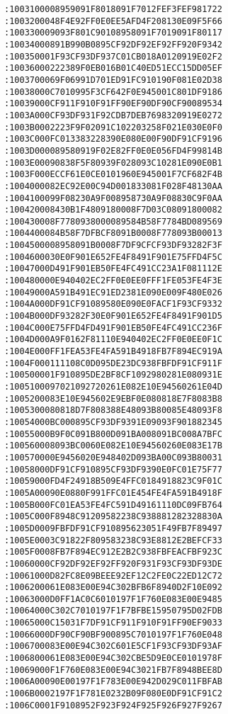 \begin{lstlisting}[language={}, basicstyle=\scriptsize, caption=Машинний код]
:1003100008959091F8018091F7012FEF3FEF981722
:1003200048F4E92FF0E0EE5AFD4F208130E09F5F66
:100330009093F801C90108958091F7019091F80117
:10034000891B990B0895CF92DF92EF92FF920F9342
:100350001F93CF93DF937C01CB018A0120919E02F2
:10036000222389F0EB016B01C40ED51ECC15DD05EF
:1003700069F06991D701ED91FC910190F081E02D38
:10038000C7010995F3CF642F0E945001C801DF9186
:10039000CF911F910F91FF90EF90DF90CF90089534
:1003A000CF93DF931F92CDB7DEB7698320919E0272
:1003B0002223F9F02091C102203258F021E030E0F0
:1003C000FC013383228390E080E00F90DF91CF9196
:1003D000089580919F02E82FF0E0E056FD4F99814B
:1003E00090838F5F80939F028093C10281E090E0B1
:1003F000ECCF61E0CE0101960E945001F7CF682F4B
:1004000082EC92E00C94D001833081F028F48130AA
:1004100099F08230A9F008958730A9F08830C9F0AA
:100420008430B1F4809180008F7D03C08091800082
:100430008F7780938000089584B58F7784BD089569
:1004400084B58F7DFBCF8091B0008F778093B00013
:1004500008958091B0008F7DF9CFCF93DF93282F3F
:1004600030E0F901E652FE4F8491F901E75FFD4F5C
:10047000D491F901EB50FE4FC491CC23A1F081112E
:100480000E940402EC2FF0E0EE0FFF1FE053FE4F3E
:10049000A591B491EC91ED2381E090E009F480E026
:1004A000DF91CF91089580E090E0FACF1F93CF9332
:1004B000DF93282F30E0F901E652FE4F8491F901D5
:1004C000E75FFD4FD491F901EB50FE4FC491CC236F
:1004D000A9F0162F81110E940402EC2FF0E0EE0F1C
:1004E000FF1FEA53FE4FA591B4918FB7F894EC919A
:1004F000111108C0D095DE23DC938FBFDF91CF911F
:100500001F910895DE2BF8CF1092980281E080931E
:1005100097021092720261E082E10E94560261E04D
:1005200083E10E945602E9EBF0E080818E7F8083B8
:1005300080818D7F808388E48093B80085E48093F8
:10054000BC000895CF93DF9391E09093F901882345
:10055000B9F0C091B800D091BA008091BC008A7BFC
:100560008093BC0060E082E10E94560260E083E17B
:100570000E9456020E948402D093BA00C093B80031
:10058000DF91CF910895CF93DF9390E0FC01E75F77
:10059000FD4F24918B509E4FFC0184918823C9F01C
:1005A00090E0880F991FFC01E454FE4FA591B4918F
:1005B000FC01EA53FE4FC591D49161110DC09FB764
:1005C000F8948C91209582238C938881282328830A
:1005D0009FBFDF91CF910895623051F49FB7F89497
:1005E0003C91822F809583238C93E8812E2BEFCF33
:1005F0008FB7F894EC912E2B2C938FBFEACFBF923C
:10060000CF92DF92EF92FF920F931F93CF93DF93DE
:10061000D82FC8E09BEEE92EF12C2FE0C22ED12C72
:1006200061E083E00E94C302BFB6F8940D2F10E092
:10063000D0FF1AC0C6010197F1F760E083E00E9485
:10064000C302C7010197F1F7BFBE15950795D02FDB
:10065000C15031F7DF91CF911F910F91FF90EF9033
:10066000DF90CF90BF900895C7010197F1F760E048
:1006700083E00E94C302C601E5CF1F93CF93DF93AF
:1006800061E083E00E94C302CBE5D9E0CE0101978F
:10069000F1F760E083E00E94C3021FB7F8948BEE8D
:1006A00090E00197F1F783E00E942D029C011FBFAB
:1006B0002197F1F781E0232B09F080E0DF91CF91C2
:1006C0001F9108952F923F924F925F926F927F9267

\end{lstlisting}

